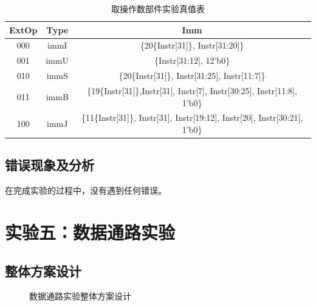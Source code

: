 \documentclass[12pt, a4paper]{ctexart}
\begin{document}
\begin{table}[H]
    \centering
    \begin{tabular}{|c|c|c|}
        \hline
        ExtOp & Type & Imm \\
        \hline
        000 & immI & \{20\{Instr[31]\}, Instr[31:20]\} \\
        001 & immU & \{Instr[31:12], 12'b0\} \\
        010 & immS & \{20\{Instr[31]\}, Instr[31:25], Instr[11:7]\} \\
        011 & immB & \{19\{Instr[31]\},Instr[31], Instr[7], Instr[30:25], Instr[11:8], 1'b0\} \\
        100 & immJ & \{11\{Instr[31]\}, Instr[31], Instr[19:12], Instr[20], Instr[30:21], 1'b0\} \\
        \hline
    \end{tabular}
    \caption{取操作数部件实验真值表}
\end{table}

\subsection{错误现象及分析}

在完成实验的过程中，没有遇到任何错误。

\section{实验五：数据通路实验}

\subsection{整体方案设计}

\begin{figure}[H]
    \centering
    \caption{数据通路实验整体方案设计}
\end{figure}
\end{document}
